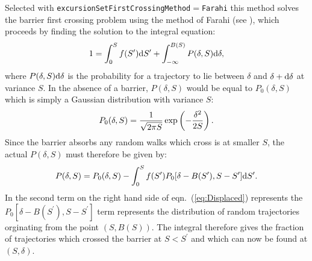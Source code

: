 Selected with {\tt excursionSetFirstCrossingMethod}$=${\tt Farahi} this method solves the barrier first crossing problem using the method of Farahi (see \citealt{benson_dark_2012}), which proceeds by finding the solution to the integral equation:
\begin{equation}
  1 =  \int_0^S f(S^\prime){\rm d}S^\prime + \int_{-\infty}^{B(S)} P(\delta,S) {\rm d} \delta,
 \label{eq:OldExcursionMethod}
\end{equation}
where $P(\delta,S) {\rm d} \delta$ is the probability for a trajectory to lie between $\delta$ and $\delta + {\rm d} \delta$ at variance $S$. In the absence of a barrier, $P(\delta,S)$ would be equal to $P_0(\delta,S)$ which is simply a Gaussian distribution with variance $S$:
\begin{equation}
  P_0(\delta,S) = \frac{1}{\sqrt{2 \pi S}} \exp\left(-{\delta^2 \over 2 S}\right).
  \label{eq:Gaussian}
\end{equation}
Since the barrier absorbs any random walks which cross is at smaller $S$, the actual $P(\delta,S)$ must therefore be given by:
\begin{equation}
   P(\delta,S) = P_0(\delta,S) - \int_{0}^{S} f(S^\prime) P_0[\delta - B(S^\prime),S - S^\prime]{\rm d}S^\prime .
 \label{eq:Displaced}
\end{equation}
In the second term on the right hand side of eqn.~(\ref{eq:Displaced}) represents the $P_0[\delta - B(S^\prime),S - S^\prime]$ term represents the distribution of random trajectories orginating from the point $(S,B(S))$. The integral therefore gives the fraction of trajectories which crossed the barrier at $S<S^\prime$ and which can now be found at $(S,\delta)$.

